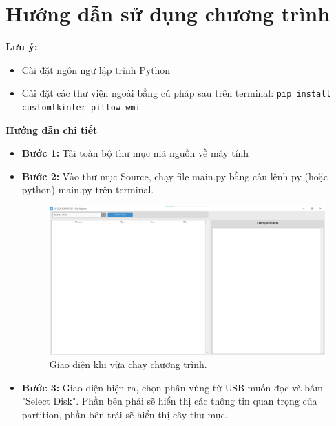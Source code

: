 \section{Hướng dẫn sử dụng chương trình}
\textbf{Lưu ý:}
\begin{itemize}
    \item Cài đặt ngôn ngữ lập trình Python
    \item Cài đặt các thư viện ngoài bằng cú pháp sau trên terminal: \texttt{pip install customtkinter pillow wmi}
\end{itemize}

\textbf{Hướng dẫn chi tiết}
\begin{itemize}
    \item \textbf{Bước 1:} Tải toàn bộ thư mục mã nguồn về máy tính
    \item \textbf{Bước 2:} Vào thư mục Source, chạy file main.py bằng câu lệnh py (hoặc python) main.py trên terminal.
    \begin{figure}[H]
        \centering
        \includegraphics[width=\textwidth]{images/img1.png} 
        \caption{Giao diện khi vừa chạy chương trình.}
        \label{figure:s1}
\end{figure}
    \newpage
    \item \textbf{Bước 3:} Giao diện hiện ra, chọn phân vùng từ USB muốn đọc và bấm "Select Disk". Phần bên phải sẽ hiển thị các thông tin quan trọng của partition, phần bên trái sẽ hiển thị cây thư mục.


\end{itemize}
